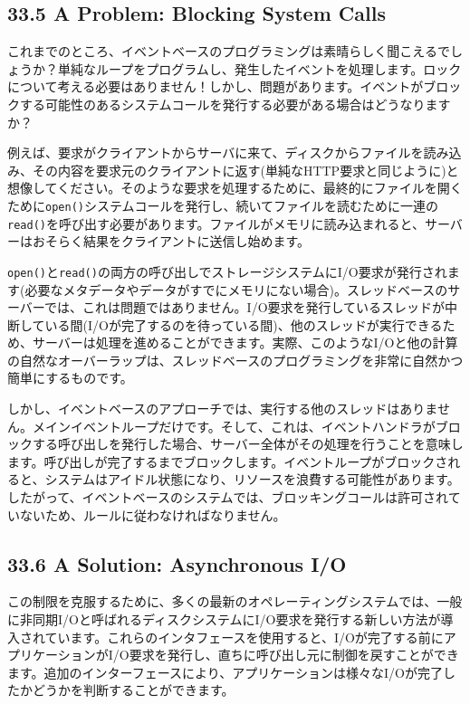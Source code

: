 \hypertarget{a-problem-blocking-system-calls}{%
\subsection*{33.5 A Problem: Blocking System
Calls}\label{a-problem-blocking-system-calls}}

これまでのところ、イベントベースのプログラミングは素晴らしく聞こえるでしょうか？単純なループをプログラムし、発生したイベントを処理します。ロックについて考える必要はありません！しかし、問題があります。イベントがブロックする可能性のあるシステムコールを発行する必要がある場合はどうなりますか？

例えば、要求がクライアントからサーバに来て、ディスクからファイルを読み込み、その内容を要求元のクライアントに返す(単純なHTTP要求と同じように)と想像してください。そのような要求を処理するために、最終的にファイルを開くために\texttt{open()}システムコールを発行し、続いてファイルを読むために一連の\texttt{read()}を呼び出す必要があります。ファイルがメモリに読み込まれると、サーバーはおそらく結果をクライアントに送信し始めます。

\texttt{open()}と\texttt{read()}の両方の呼び出しでストレージシステムにI/O要求が発行されます(必要なメタデータやデータがすでにメモリにない場合)。スレッドベースのサーバーでは、これは問題ではありません。I/O要求を発行しているスレッドが中断している間(I/Oが完了するのを待っている間)、他のスレッドが実行できるため、サーバーは処理を進めることができます。実際、このようなI/Oと他の計算の自然なオーバーラップは、スレッドベースのプログラミングを非常に自然かつ簡単にするものです。

しかし、イベントベースのアプローチでは、実行する他のスレッドはありません。メインイベントループだけです。そして、これは、イベントハンドラがブロックする呼び出しを発行した場合、サーバー全体がその処理を行うことを意味します。呼び出しが完了するまでブロックします。イベントループがブロックされると、システムはアイドル状態になり、リソースを浪費する可能性があります。したがって、イベントベースのシステムでは、ブロッキングコールは許可されていないため、ルールに従わなければなりません。

\hypertarget{a-solution-asynchronous-io}{%
\subsection*{33.6 A Solution: Asynchronous
I/O}\label{a-solution-asynchronous-io}}

この制限を克服するために、多くの最新のオペレーティングシステムでは、一般に非同期I/Oと呼ばれるディスクシステムにI/O要求を発行する新しい方法が導入されています。これらのインタフェースを使用すると、I/Oが完了する前にアプリケーションがI/O要求を発行し、直ちに呼び出し元に制御を戻すことができます。追加のインターフェースにより、アプリケーションは様々なI/Oが完了したかどうかを判断することができます。

